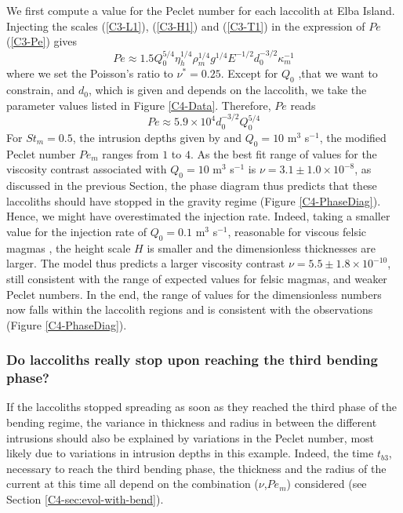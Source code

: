 We first compute  a value for the Peclet number  for each laccolith at
Elba  Island. Injecting  the scales  (\ref{C3-L1}), (\ref{C3-H1})  and
(\ref{C3-T1}) in the expression of $Pe$ (\ref{C3-Pe}) gives
\begin{equation}
  Pe \approx 1.5 Q_{0}^{5/4}\eta_{h}^{1/4}\rho_m^{1/4}g^{1/4}E^{-1/2} d_0^{-3/2} \kappa_m^{-1}
\end{equation}
where we  set the  Poisson's ratio to  $\nu^*=0.25$. Except  for $Q_0$
,that we want  to constrain, and $d_0$, which is  given and depends on
the  laccolith,  we  take  the   parameter  values  listed  in  Figure
\ref{C4-Data}.  Therefore, $Pe$ reads
\begin{equation}
  Pe \approx 5.9\times10^4 d_0^{-3/2} Q_0^{5/4}
  \label{PeExpre}
\end{equation}
For $St_m  =0.5$, the intrusion depths  given by \citet{Rocchi:2002jy}
and  $Q_0 =10$  m$^{3}$ s$^{-1}$,  the modified  Peclet number  $Pe_m$
ranges from  $1$ to  $4$.  As  the best  fit range  of values  for the
viscosity  contrast  associated  with  $Q_0=10$  m$^{3}$  s$^{-1}$  is
$\nu  = 3.1\pm  1.0  \times  10^{-8}$, as  discussed  in the  previous
Section, the phase diagram thus  predicts that these laccoliths should
have stopped in the gravity regime (Figure \ref{C4-PhaseDiag}). Hence,
we  might have  overestimated the  injection rate.   Indeed, taking  a
smaller value  for the injection  rate of $Q_0=0.1$  m$^{3}$ s$^{-1}$,
reasonable for viscous felsic magmas \citep{Harris:2000jd}, the height
scale $H$  is smaller  and the  dimensionless thicknesses  are larger.
The    model   thus    predicts    a    larger   viscosity    contrast
$\nu=5.5\pm1.8\times  10^{-10}$, still  consistent with  the range  of
expected values for felsic magmas,  and weaker Peclet numbers.  In the
end,  the range  of values  for  the dimensionless  numbers now  falls
within the laccolith  regions and is consistent  with the observations
(Figure \ref{C4-PhaseDiag}).

\subsubsection*{Do  laccoliths really  stop  upon  reaching the  third
  bending phase?}

If the laccoliths stopped spreading as  soon as they reached the third
phase of the  bending regime, the variance in thickness  and radius in
between  the   different  intrusions  should  also   be  explained  by
variations  in the  Peclet number,  most likely  due to  variations in
intrusion  depths  in  this   example.   Indeed,  the  time  $t_{b3}$,
necessary  to reach  the third  bending phase,  the thickness  and the
radius  of the  current at  this time  all depend  on the  combination
($\nu$,$Pe_m$) considered (see Section \ref{C4-sec:evol-with-bend}).

